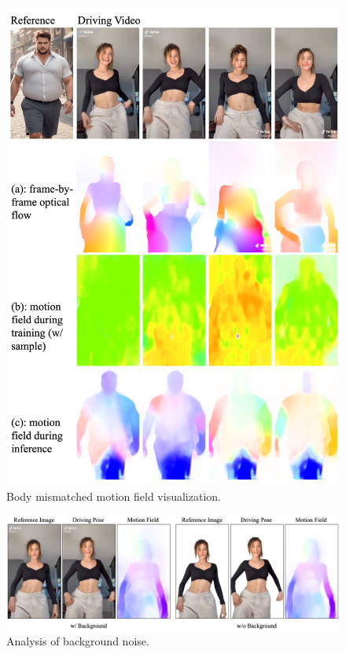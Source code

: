 \begin{figure}[t]
    \centering
    \includegraphics[width=.9\columnwidth]{./image/flow2.png}
    \vspace{-10pt}
    \caption{Body mismatched motion field visualization.}
    \label{fig: appendix_flow2}
\end{figure}

\begin{figure}[t]
    \centering
    \includegraphics[width=.9\columnwidth]{./image/flow_noise.png}
    \vspace{-10pt}
    \caption{Analysis of background noise.}
    \label{fig: appendix_flow_noise}
\end{figure}